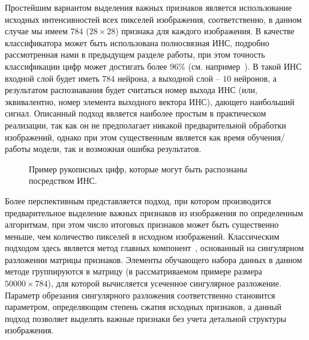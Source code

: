\documentclass[a4paper,12pt,russian]{article} %
\begin{document}
Простейшим вариантом выделения важных признаков является использование исходных интенсивностей всех пикселей изображения, соответственно, в данном случае мы имеем $784$ ($28 \times 28$) признака для каждого изображения.
В качестве классификатора может быть использована полносвязная ИНС, подробно рассмотренная нами в предыдущем разделе работы, при этом точность классификации цифр может достигать более $96\%$ (см. например~\cite{singh2011digit}).
В такой ИНС входной слой будет иметь $784$ нейрона, а выходной слой -- $10$ нейронов, а результатом распознавания будет считаться номер выхода ИНС (или, эквивалентно, номер элемента выходного вектора ИНС), дающего наибольший сигнал.
Описанный подход является наиболее простым в практическом реализации, так как он не предполагает никакой предварительной обработки изображений, однако при этом существенным является как время обучения/работы модели, так и возможная ошибка результатов.

\begin{figure}[t!]
	\caption{
		Пример рукописных цифр, которые могут быть распознаны посредством ИНС.
        }
        \label{fig:nn_digits_many}
\end{figure}

Более перспективным представляется подход, при котором производится предварительное выделение важных признаков из изображения по определенным алгоритмам, при этом число итоговых признаков может быть существенно меньше, чем количество пикселей в исходном изображений.
Классическим подходом здесь является метод главных компонент~\cite{karamizadeh2013overview}, основанный на сингулярном разложении матрицы признаков.
Элементы обучающего набора данных в данном методе группируются в матрицу (в рассматриваемом примере размера $50000 \times 784$), для которой вычисляется усеченное сингулярное разложение.
Параметр обрезания сингулярного разложения соответственно становится параметром, определяющим степень сжатия исходных признаков, а данный подход позволяет выделять важные признаки без учета детальной структуры изображения.
\end{document}
